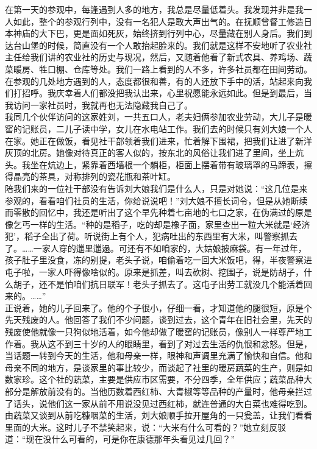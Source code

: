 在第一天的参观中，每逢遇到人多的地方，我总是尽量低着头。我发现并非是我一人如此，整个的参观行列中，没有一名犯人是敢大声出气的。在抚顺曾督工修造日本神庙的大下巴，更是面如死灰，始终挤到行列中心，尽量藏在别人身后。我们到达台山堡的时候，简直没有一个人敢抬起脸来的。我们就是这样不安地听了农业社主任给我们讲的农业社的历史与现况，然后，又随着他看了新式农具、养鸡场、蔬菜暖房、牲口棚、仓库等处。我们一路上看到的人不多，许多社员都在田间劳动。在参观的几处地方遇到的人，态度都很和善，有的人还放下手中的活，站起来向我们打招呼。我庆幸着人们都没把我认出来，心里祝愿能永远如此。但是到最后，当我访问一家社员时，我就再也无法隐藏我自己了。\\

我同几个伙伴访问的这家姓刘，一共五口人，老夫妇俩参加农业劳动，大儿子是暖窖的记账员，二儿子读中学，女儿在水电站工作。我们去的时候只有刘大娘一个人在家。她正在做饭，看见社干部领着我们进来，忙着解下围裙，把我们让进了新洋灰顶的北房。她像对待真正的客人似的，按东北的风俗让我们进了里间，坐上炕头。我坐在炕边上，紧靠着西墙根一个躺柜，柜面上摆着带有玻璃罩的马蹄表，擦得晶亮的茶具，对称排列的瓷花瓶和茶叶缸。\\

陪我们来的一位社干部没有告诉刘大娘我们是什么人，只是对她说：“这几位是来参观的，看看咱们社员的生活，你给说说吧！”刘大娘不擅长词令，但是从她断续而零散的回忆中，我还是听出了这个早先种着七亩地的七口之家，在伪满过的原是像乞丐一样的生活。“种的是稻子，吃的却是橡子面，家里查出一粒大米就是‘经济犯’，稻子全出了荷。听说街上有个人，犯病吐出的东西里有大米，叫警察抓去了。……一家人穿的邋里邋遢。可还有不如咱家的，大姑娘披麻袋。有一年过年，孩子肚子里没食，冻的别提，老头子说，咱偷着吃一回大米饭吧，得，半夜警察进屯子啦，一家人吓得像啥似的。原来是抓差，叫去砍树、挖围子，说是防胡子，什么胡子，还不是怕咱们抗日联军！老头子抓去了。这屯子出劳工就没几个能活着回来的。……”\\

正说着，她的儿子回来了。他的个子很小，仔细一看，才知道他的腿很短，原是个先天残废的人。他回答了我们不少问题，谈到过去，这个青年在旧社会里，先天的残废使他就像一只狗似地活着，如今他却做了暖窖的记账员，像别人一样尊严地工作着。我从这不到三十岁的人的眼睛里，看到了对过去生活的仇恨和忿怒。但是，当话题一转到今天的生活，他和母亲一样，眼神和声调里充满了愉快和自信。他和母亲不同的地方，是谈家里的事比较少，而谈起了社里的暖房蔬菜的生产，则是如数家珍。这个社的蔬菜，主要是供应市区需要，不分四季，全年供应；蔬菜品种大部分是解放前没有的。当他历数着西红柿、大青椒等等品种的产量时，他母亲拦过了话头，说他们这一家从前不用说没见过西红柿，就连普通的大白菜也难得吃到。由蔬菜又谈到从前吃糠咽菜的生活，刘大娘顺手拉开屋角的一只瓮盖，让我们看看里面的大米。这时儿子不禁笑起来，说：“大米有什么可看的？”她立刻反驳道：“现在没什么可看的，可是你在康德那年头看见过几回？”\\

